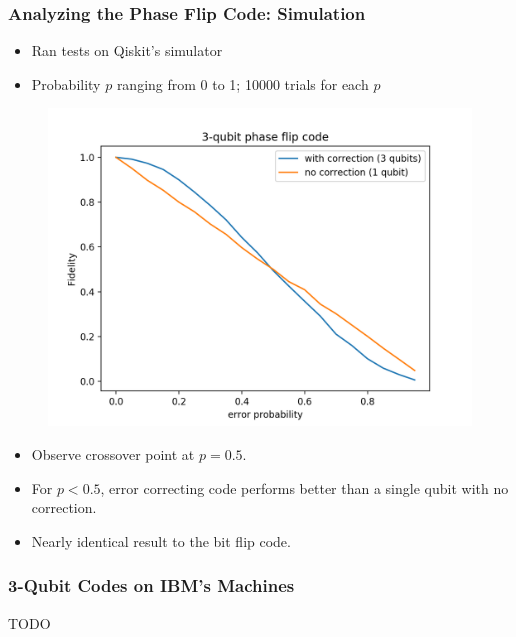 \documentclass{beamer}
\begin{document}
\begin{frame}
    \frametitle{Analyzing the Phase Flip Code: Simulation}
    \begin{itemize}
        \item Ran tests on Qiskit's simulator
        \item Probability $p$ ranging from 0 to 1; 10000 trials for each $p$
        
        
    \end{itemize}
    \begin{minipage}{0.45\textwidth}
        \begin{figure}[H]
        \includegraphics[scale=0.4]{3qb-pf-overlay.png}
        \end{figure}
        \end{minipage} \hfill
        \begin{minipage}{0.45\textwidth}
        \begin{itemize}
        \item Observe crossover point at $p=0.5$.
        \item For $p<0.5$, error correcting code performs better than a single qubit with no correction.
        \item Nearly identical result to the bit flip code.
        \end{itemize}
    \end{minipage}
\end{frame}

\begin{frame}
    \frametitle{3-Qubit Codes on IBM's Machines}
   
    TODO
    
\end{frame}
\end{document}
